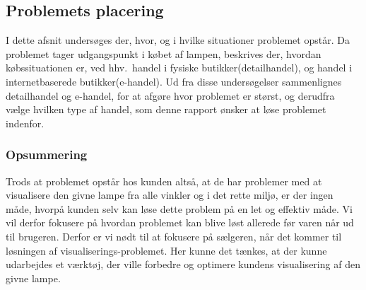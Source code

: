 \subsection{Problemets placering}
I dette afsnit undersøges der, hvor, og i hvilke situationer problemet opstår. Da problemet tager udgangspunkt i købet af lampen, beskrives der, hvordan købssituationen er, ved hhv.\ handel i fysiske butikker(detailhandel), og handel i internetbaserede butikker(e-handel). Ud fra disse undersøgelser sammenlignes detailhandel og e-handel, for at afgøre hvor problemet er størst, og derudfra vælge hvilken type af handel, som denne rapport ønsker at løse problemet indenfor.







\subsubsection*{Opsummering}
Trods at problemet opstår hos kunden altså, at de har problemer med at visualisere den givne lampe fra alle vinkler og i det rette miljø, er der ingen måde, hvorpå kunden selv kan løse dette problem på en let og effektiv måde. Vi vil derfor fokusere på hvordan problemet kan blive løst allerede før varen når ud til brugeren. Derfor er vi nødt til at fokusere på sælgeren, når det kommer til løsningen af visualiserings-problemet. Her kunne det tænkes, at der kunne udarbejdes et værktøj, der ville forbedre og optimere kundens visualisering af den givne lampe.

